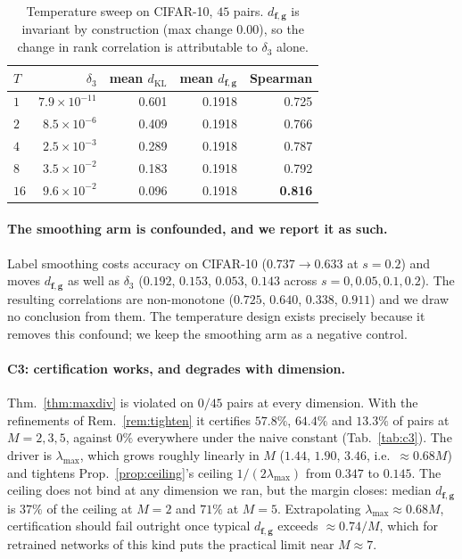 \documentclass[10pt,letterpaper,twocolumn]{article}
\newcommand{\bff}{\mathbf{f}}
\newcommand{\bfg}{\mathbf{g}}
\newcommand{\dKL}{d_{\mathrm{KL}}}
\newcommand{\dfg}{d_{\bff,\bfg}}
\theoremstyle{plain}
\theoremstyle{definition}
\theoremstyle{remark}
\begin{document}
\begin{table}[t]
\centering\small
\caption{Temperature sweep on CIFAR-10, $45$ pairs. $\dfg$ is invariant by
construction (max change $0.00$), so the change in rank correlation is
attributable to $\delta_{3}$ alone.}
\label{tab:temp}
\begin{tabular}{@{}lrrrr@{}}
\toprule
$T$ & $\delta_{3}$ & mean $\dKL$ & mean $\dfg$ & Spearman \\
\midrule
$1$  & $7.9\times10^{-11}$ & 0.601 & 0.1918 & 0.725 \\
$2$  & $8.5\times10^{-6}$  & 0.409 & 0.1918 & 0.766 \\
$4$  & $2.5\times10^{-3}$  & 0.289 & 0.1918 & 0.787 \\
$8$  & $3.5\times10^{-2}$  & 0.183 & 0.1918 & 0.792 \\
$16$ & $9.6\times10^{-2}$  & 0.096 & 0.1918 & \textbf{0.816} \\
\bottomrule
\end{tabular}
\end{table}

\paragraph{The smoothing arm is confounded, and we report it as such.}
Label smoothing costs accuracy on CIFAR-10 ($0.737\to0.633$ at $s=0.2$) and
moves $\dfg$ as well as $\delta_{3}$ ($0.192$, $0.153$, $0.053$, $0.143$ across
$s=0,0.05,0.1,0.2$). The resulting correlations are non-monotone
($0.725$, $0.640$, $0.338$, $0.911$) and we draw no conclusion from them. The
temperature design exists precisely because it removes this confound; we keep
the smoothing arm as a negative control.

\paragraph{C3: certification works, and degrades with dimension.}
Thm.~\ref{thm:maxdiv} is violated on $0/45$ pairs at every dimension. With the
refinements of Rem.~\ref{rem:tighten} it certifies $57.8\%$, $64.4\%$ and
$13.3\%$ of pairs at $M=2,3,5$, against $0\%$ everywhere under the naive
constant (Tab.~\ref{tab:c3}). The driver is $\lambda_{\max}$, which grows
roughly linearly in $M$ ($1.44$, $1.90$, $3.46$, i.e.\ $\approx0.68M$) and
tightens Prop.~\ref{prop:ceiling}'s ceiling $1/(2\lambda_{\max})$ from $0.347$
to $0.145$. The ceiling does not bind at any dimension we ran, but the margin
closes: median $\dfg$ is $37\%$ of the ceiling at $M{=}2$ and $71\%$ at
$M{=}5$. Extrapolating $\lambda_{\max}\approx0.68M$, certification should fail
outright once typical $\dfg$ exceeds $\approx0.74/M$, which for retrained
networks of this kind puts the practical limit near $M\approx7$.
\end{document}
